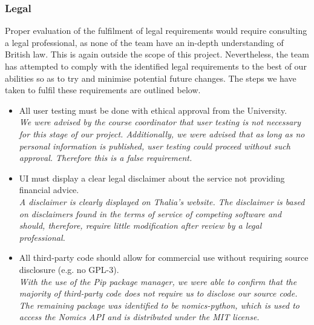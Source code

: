 \documentclass[main.tex]{subfiles}
\begin{document}
\subsubsection{Legal}
Proper evaluation of the fulfilment of legal requirements would require consulting a legal professional, as none of the team have an in-depth understanding of British law. This is again outside the scope of this project. Nevertheless, the team has attempted to comply with the identified legal requirements to the best of our abilities so as to try and minimise potential future changes. The steps we have taken to fulfil these requirements are outlined below. 

\begin{itemize}

\item All user testing must be done with ethical approval from the University.\\
\textit{We were advised by the course coordinator that user testing is not necessary for this stage of our project. Additionally, we were advised that as long as no personal information is published, user testing could proceed without such approval. Therefore this is a false requirement.}

\item UI must display a clear legal disclaimer about the service not providing ﬁnancial advice.\\
\textit{A disclaimer is clearly displayed on Thalia’s website. The disclaimer is based on disclaimers found in the terms of service of competing software \cite{portfolioVisualizerToS} and should, therefore, require little modification after review by a legal professional.}

\item All third-party code should allow for commercial use without requiring source disclosure (e.g. no GPL-3).\\
\textit{With the use of the Pip package manager, we were able to confirm that the majority of third-party code does not require us to disclose our source code. The remaining package was identified to be nomics-python, which is used to access the Nomics API and is distributed under the MIT license.}




\end{itemize}
\end{document}
